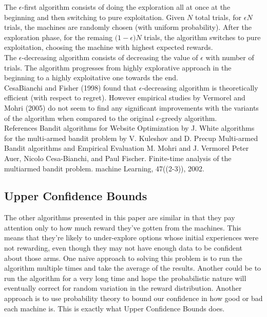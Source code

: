 \documentclass{article}
\begin{document}
The $\epsilon$-first algorithm consists of doing the exploration all at once at the beginning and then switching to pure exploitation. Given $N$ total trials, for $\epsilon N$ trials, the machines are randomly chosen (with uniform probability). After the exploration phase, for the remaing $\big( 1-\epsilon \big) N$ trials, the algorithm switches to pure exploitation, choosing the machine with highest expected rewards.\\

The $\epsilon$-decreasing algorithm consists of decreasing the value of $\epsilon$ with number of trials. The algorithm progresses from highly explorative approach in the beginning to a highly exploitative one towards the end.\\

CesaBianchi and Fisher (1998) found that $\epsilon$-decreasing algorithm is theoretically efficient (with respect to regret). However empirical studies by Vermorel and Mohri (2005) do not seem to find any significant improvements with the variants of the algorithm when compared to the original $\epsilon$-greedy algorithm.\\


References
Bandit algorithms for Website Optimization by J. White
algorithms for the multi-armed bandit problem by V. Kuleshov and D. Precup
Multi-armed Bandit algorithms and Empirical Evaluation M. Mohri and J. Vermorel
Peter Auer, Nicolo Cesa-Bianchi, and Paul Fischer. Finite-time analysis of the multiarmed bandit problem. machine Learning, 47((2-3)), 2002.

\subsection{Upper Confidence Bounds}

The other algorithms presented in this paper are similar in that they pay attention only to how much reward they’ve gotten from the machines. This means that they're likely to under-explore options whose initial experiences were not rewarding, even though they may not have enough data to be confident about those arms. One naive approach to solving this problem is to run the algorithm multiple times and take the average of the results. Another could be to run the algorithm for a very long time and hope the probabilistic nature will eventually correct for random variation in the reward distribution. Another approach is to use probability theory to bound our confidence in how good or bad each machine is. This is exactly what Upper Confidence Bounds does.\\
\end{document}
